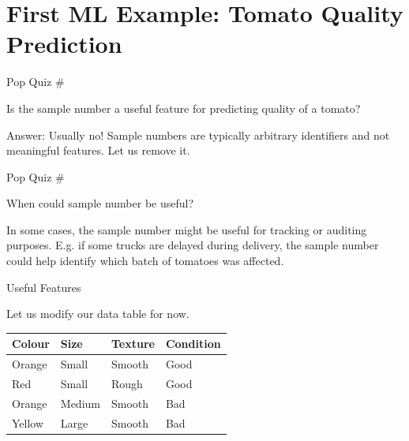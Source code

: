 \documentclass[usenames,dvipsnames]{beamer}
\begin{document}
\section{First ML Example: Tomato Quality Prediction}

\begin{frame}{Pop Quiz \#\thepopquiz}
\begin{popquizbox}{\thepopquiz}
Is the sample number a useful feature for predicting quality of a tomato?

\pause Answer: Usually no! Sample numbers are typically arbitrary identifiers and not meaningful features. Let us remove it.

\end{popquizbox}
\end{frame}

\begin{frame}{Pop Quiz \#\thepopquiz{} }
	\begin{popquizbox}{\thepopquiz}

When could sample number be useful?


\pause
In some cases, the sample number might be useful for tracking or auditing purposes. 
E.g. if some trucks are delayed during delivery, the sample number could help identify 
which batch of tomatoes was affected.
\end{popquizbox}

\end{frame}


\begin{frame}{Useful Features}


\pause Let us modify our data table for now.

\begin{table}[]
	\begin{tabular}{|l|l|l||l|}
		\hline 
		\textbf{Colour} & \textbf{Size} & \textbf{Texture} & \textbf{Condition} \\ \hline 
		Orange & Small & Smooth  & Good      \\
		Red    & Small  & Rough  & Good \\
		Orange & Medium & Smooth & Bad \\
		Yellow & Large  & Smooth & Bad \\ \hline 

	\end{tabular}
\end{table}
\end{frame}
\end{document}
